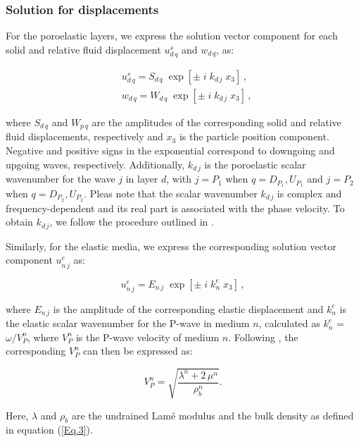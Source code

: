 \documentclass[draft]{agujournal2019}
\begin{document}
\subsubsection{Solution for displacements}
For the poro\-elastic layers, we express the solution vector component for each solid and relative fluid displacement $u_{d\,q}^s$ and $w_{d\, q}$, as:
\begin{linenomath*}
\begin{equation}\label{Eq.10}
\begin{split}
& u_{d\,q}^s = S_{d\, q}\;\exp[ \pm \; i \; k_{d \,j} \; x_3 ] \, ,\\
& w_{d \,q} = W_{d\,q}\;\exp[\pm \; i\;  k_{d\,j} \;x_3 ] \, ,
\end{split}
\end{equation}
\end{linenomath*}
where $ S_{d\, q}$ and $W_{p\,q}$
are the amplitudes of the corresponding solid and relative fluid displacements, respectively and $x_3$ is the particle position component. Negative and positive signs in the exponential correspond to downgoing and upgoing waves, respectively. Additionally, 
$ k_{d\,j}$ is the poroelastic scalar wave\-number for the wave $j$ in layer $d$, with $j=P_1$ when $q=D_{P_1},U_{P_1}$ and $j=P_2$ when $q=D_{P_2},U_{P_2}$. Pleas note that the scalar wave\-number $ k_{d\,j}$ is complex and frequency-dependent and its real part is associated with the phase velocity. To obtain
$ k_{d\,j}$, we follow the procedure outlined in .

Similarly, for the elastic media, we express the corresponding solution vector component $u_{n\,j}^e$ as:
\begin{linenomath*}
\begin{equation}\label{Eq.11}
u_{n\,j}^e = E_{n \,j} \;\exp[ \pm\; i \; k_{n}^e \; x_3 ]\,,
\end{equation}
\end{linenomath*}
where $E_{n \,j}$ is the amplitude of the corresponding elastic displacement and $ k_{n}^e$ is the elastic scalar wave\-number for the P-wave in medium $n$, calculated as $ k_{n}^e$ = $\omega / V_P^n$, where $V_P^n$ is the P-wave velocity of medium $n$. 
Following , the corresponding $V_P^n$ can then be expressed as:
\begin{linenomath*}
\begin{equation}\label{Eq.12}
V_P^n = \sqrt{\frac{\lambda^n +  2\, \mu^n}{\rho_b^n}} .
\end{equation}
\end{linenomath*}
Here, $\lambda$ and $\rho_b$ are the undrained Lamé modulus and the bulk density as defined in equation (\ref{Eq.3}).
\end{document}
